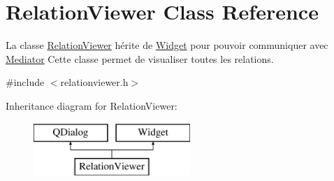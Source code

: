 \hypertarget{classRelationViewer}{}\section{Relation\+Viewer Class Reference}
\label{classRelationViewer}


La classe \hyperlink{classRelationViewer}{Relation\+Viewer} hérite de \hyperlink{classWidget}{Widget} pour pouvoir communiquer avec \hyperlink{classMediator}{Mediator} Cette classe permet de visualiser toutes les relations.  




{\ttfamily \#include $<$relationviewer.\+h$>$}

Inheritance diagram for Relation\+Viewer\+:\begin{figure}[H]
\begin{center}
\leavevmode
\includegraphics[height=2.000000cm]{classRelationViewer}
\end{center}
\end{figure}
